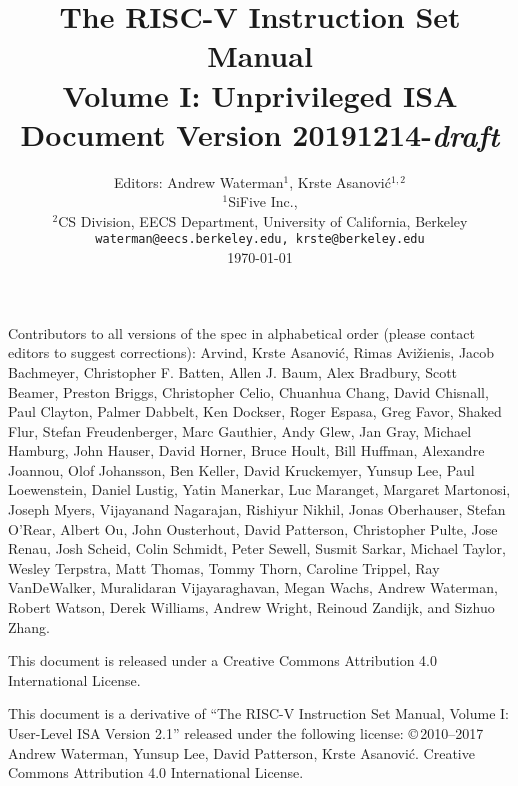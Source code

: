 \documentclass[twoside,11pt]{book}
\newcommand{\specrev}{\mbox{20191214-{\em draft}}}
\begin{document}
\title{\vspace{-0.7in}\Large {\bf The RISC-V Instruction Set Manual} \\
  \large {\bf Volume I: Unprivileged ISA} \\
  Document Version \specrev
  \vspace{-0.1in}}

\author{Editors: Andrew Waterman$^{1}$, Krste Asanovi\'{c}$^{1,2}$ \\
  $^{1}$SiFive Inc., \\
  $^{2}$CS Division, EECS Department, University of California, Berkeley \\
  {\tt waterman@eecs.berkeley.edu, krste@berkeley.edu} \\
  \today
}
\date{} 
\maketitle

Contributors to all versions of the spec in
alphabetical order (please contact editors to suggest
corrections):
Arvind, Krste Asanovi\'{c}, Rimas Avi\v{z}ienis, Jacob Bachmeyer, Christopher
F. Batten, Allen J. Baum, Alex Bradbury, Scott Beamer, Preston Briggs,
Christopher Celio, Chuanhua Chang, David Chisnall, Paul Clayton, Palmer
Dabbelt, Ken Dockser, Roger Espasa, Greg Favor,
Shaked Flur, Stefan Freudenberger,
Marc Gauthier, Andy Glew, Jan Gray, Michael Hamburg,
John Hauser, David Horner, Bruce Hoult, Bill Huffman, Alexandre Joannou,
Olof Johansson, Ben Keller, David Kruckemyer, Yunsup Lee,
Paul Loewenstein, Daniel Lustig, Yatin Manerkar, Luc Maranget, Margaret
Martonosi, Joseph Myers, Vijayanand Nagarajan, Rishiyur Nikhil, Jonas
Oberhauser, Stefan O'Rear, Albert Ou, John Ousterhout, David Patterson,
Christopher Pulte, Jose Renau, Josh Scheid, Colin Schmidt, Peter Sewell, Susmit Sarkar,
Michael Taylor, Wesley Terpstra, Matt Thomas, Tommy Thorn, Caroline Trippel,
Ray VanDeWalker, Muralidaran Vijayaraghavan, Megan Wachs, Andrew Waterman,
Robert Watson, Derek Williams, Andrew Wright, Reinoud Zandijk, and Sizhuo
Zhang.

This document is released under a Creative Commons Attribution 4.0
International License.

This document is a derivative of ``The RISC-V Instruction Set
Manual, Volume I: User-Level ISA Version 2.1'' released under the following license:
\copyright \,2010--2017 Andrew Waterman, Yunsup Lee, David Patterson, Krste Asanovi\'{c}. 
Creative Commons Attribution 4.0 International License.
\end{document}
